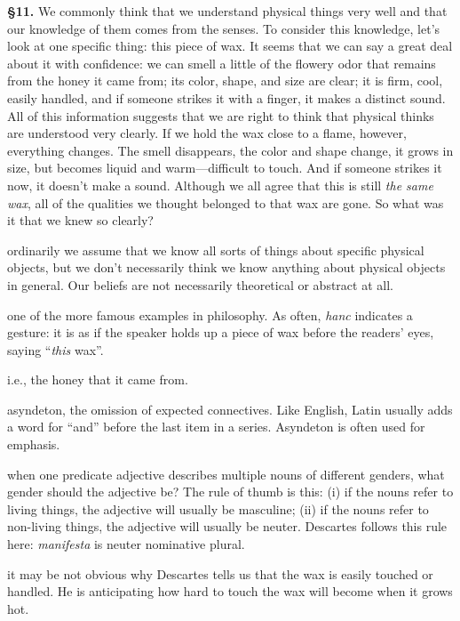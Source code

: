 \textbf{§11.} We commonly think that we understand physical things very well and that our knowledge of them comes from the senses. To consider this knowledge, let's look at one specific thing: this piece of wax. It seems that we can say a great deal about it with confidence: we can smell a little of the flowery odor that remains from the honey it came from; its color, shape, and size are clear; it is firm, cool, easily handled, and if someone strikes it with a finger, it makes a distinct sound. All of this information suggests that we are right to think that physical thinks are understood very clearly. If we hold the wax close to a flame, however, everything changes. The smell disappears, the color and shape change, it grows in size, but becomes liquid and warm---difficult to touch. And if someone strikes it now, it doesn't make a sound. Although we all agree that this is still \textit{the same wax}, all of the qualities we thought belonged to that wax are gone. So what was it that we knew so clearly?

 ordinarily we assume that we know all sorts of things about specific physical objects, but we don't necessarily think we know anything about physical objects in general. Our beliefs are not necessarily theoretical or abstract at all.

 one of the more famous examples in philosophy. As often, \textit{hanc} indicates a gesture: it is as if the speaker holds up a piece of wax before the readers' eyes, saying ``\textit{this} wax''.

 i.e., the honey that it came from.

 asyndeton, the omission of expected connectives. Like English, Latin usually adds a word for ``and'' before the last item in a series. Asyndeton is often used for emphasis.

 when one predicate adjective describes multiple nouns of different genders, what gender should the adjective be? The rule of thumb is this: (i) if the nouns refer to living things, the adjective will usually be masculine; (ii) if the nouns refer to non-living things, the adjective will usually be neuter. Descartes follows this rule here: \textit{manifesta} is neuter nominative plural.

 it may be not obvious why Descartes tells us that the wax is easily touched or handled. He is anticipating how hard to touch the wax will become when it grows hot.

